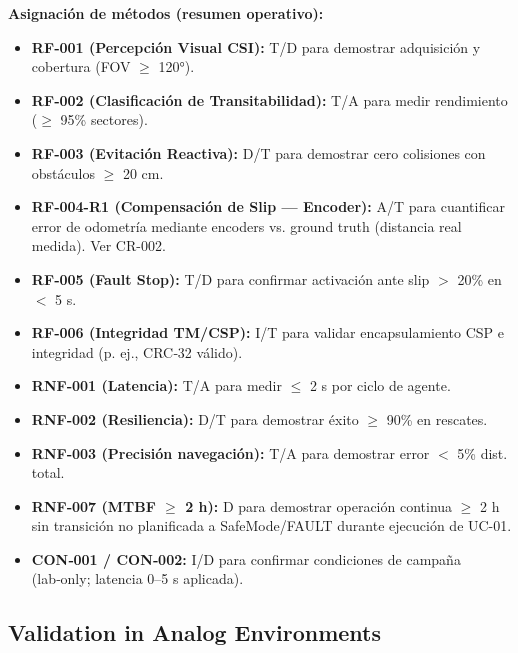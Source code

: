 \textbf{Asignación de métodos (resumen operativo):}
\begin{itemize}
    \item \textbf{RF‑001 (Percepción Visual CSI):} T/D para demostrar adquisición y cobertura (FOV $\ge$ 120°). \cite{omg_sysml_mbse, nasa_cm, segoldmine_ppi}  
    \item \textbf{RF‑002 (Clasificación de Transitabilidad):} T/A para medir rendimiento ($\ge$ 95\% sectores). \cite{omg_sysml_mbse, nasa_cm, segoldmine_ppi}  
    \item \textbf{RF‑003 (Evitación Reactiva):} D/T para demostrar cero colisiones con obstáculos $\ge$ 20 cm. \cite{omg_sysml_mbse, nasa_cm, segoldmine_ppi}  
    \item \textbf{RF‑004-R1 (Compensación de Slip — Encoder):} A/T para cuantificar error de odometría mediante encoders vs. ground truth (distancia real medida). Ver CR-002. \cite{nasa_cm, segoldmine_ppi, omg_sysml_mbse}
    \item \textbf{RF‑005 (Fault Stop):} T/D para confirmar activación ante slip $>$ 20\% en $<$ 5 s. \cite{omg_sysml_mbse, nasa_cm, segoldmine_ppi}  
    \item \textbf{RF‑006 (Integridad TM/CSP):} I/T para validar encapsulamiento CSP e integridad (p. ej., CRC‑32 válido). \cite{nasa_cm, segoldmine_ppi, omg_sysml_mbse}  
    \item \textbf{RNF‑001 (Latencia):} T/A para medir $\le$ 2 s por ciclo de agente. \cite{omg_sysml_mbse, nasa_cm, segoldmine_ppi}  
    \item \textbf{RNF‑002 (Resiliencia):} D/T para demostrar éxito $\ge$ 90\% en rescates. \cite{omg_sysml_mbse, nasa_cm, segoldmine_ppi}  
    \item \textbf{RNF‑003 (Precisión navegación):} T/A para demostrar error $<$ 5\% dist. total. \cite{omg_sysml_mbse, nasa_cm, segoldmine_ppi}  
    \item \textbf{RNF‑007 (MTBF $\ge$ 2 h):} D para demostrar operación continua $\ge$ 2 h sin transición no planificada a SafeMode/FAULT durante ejecución de UC-01. \cite{nasa_cm, segoldmine_ppi}
    \item \textbf{CON‑001 / CON‑002:} I/D para confirmar condiciones de campaña (lab‑only; latencia 0–5 s aplicada). \cite{nasa_cm, segoldmine_ppi}
\end{itemize}

\subsection{Validation in Analog Environments}

